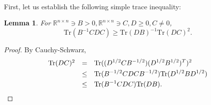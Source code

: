 \documentclass[11pt,a4paper,reqno]{amsart}
\numberwithin{equation}{section}
\newtheorem{lemma}[theorem]{Lemma}
\theoremstyle{definition}
\newcommand{\nm}{\noalign{\smallskip}}
\newcommand{\ds}{\displaystyle}
\newcommand{\<}{\ensuremath \leq}
\renewcommand{\>}{\ensuremath \geq}
\begin{document}
\hfill \\ First, let us establish the following simple trace inequality: 

\begin{lemma} \label{Simple_trace_ineq}
For $ \mathbb{R}^{n \times n} \ni B>0, \mathbb{R}^{n \times n} \ni C,D \geq 0, C \neq 0$, $$\mathrm{Tr}(B^{-1}CDC) \geq \mathrm{Tr}(DB)^{-1}\mathrm{Tr}(DC)^2.$$
\end{lemma}

\begin{proof}
By Cauchy-Schwarz, $$\begin{array}{lll}
    \mathrm{Tr}(DC)^2 &=& \ds \mathrm{Tr}((D^{1/2}CB^{-1/2})(D^{1/2}B^{1/2})^T)^2 \\
    \nm 
    &\leq& \ds \mathrm{Tr}(B^{-1/2}CDCB^{-1/2})\mathrm{Tr}(D^{1/2}BD^{1/2}) \\
    \nm 
    &\leq& \ds \mathrm{Tr}(B^{-1}CDC)\mathrm{Tr}(DB).
    \end{array}$$
\end{proof}
\end{document}
